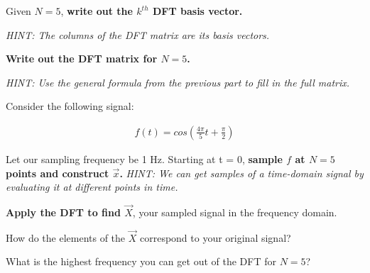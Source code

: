 \begin{enumerate}

\qitem
Given $N = 5$, { \bf write out the $k^{th}$ DFT basis vector. }

{\em HINT:
The columns of the DFT matrix are its basis vectors.
}

\sol{

}

\qitem 
{ \bf Write out the DFT matrix for $N = 5$. }

{\em HINT:
Use the general formula from the previous part to fill in the full matrix.
}

\sol{
}


\qitem

Consider the following signal:

\begin{align*}
f(t) = cos(\frac{4\pi}{5}t + \frac{\pi}{2})
\end{align*}

Let our sampling frequency be 1 Hz. Starting at t = 0, {\bf sample $f$ at $N = 5$ points and construct $\vec{x}$. }
{\em HINT:
We can get samples of a time-domain signal by evaluating it at different points in time.
}
\sol{
}

\qitem
{\bf Apply the DFT to find $\vec{X}$}, your sampled signal in the frequency domain.

\sol{
}

\qitem
How do the elements of the $\vec{X}$ correspond to your original signal?

\sol{
}

\qitem
What is the highest frequency you can get out of the DFT for $N = 5$?

\sol{
}

\end{enumerate}


